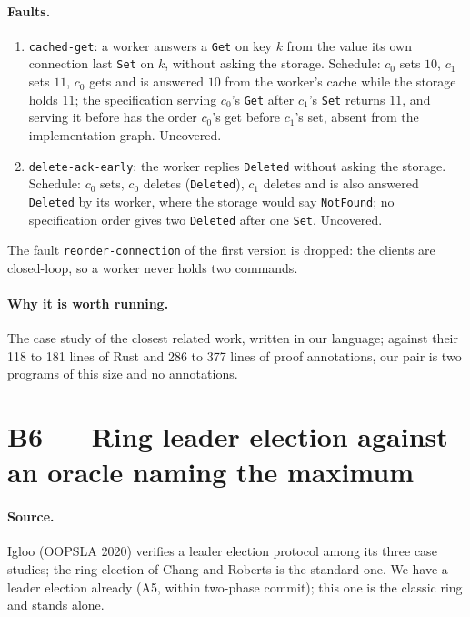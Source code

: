 \documentclass[11pt,a4paper]{article}
\newcommand{\code}[1]{\texttt{#1}}
\begin{document}
\paragraph{Faults.}
\begin{enumerate}
  \item \code{cached-get}: a worker answers a \code{Get} on key $k$ from the value its own
        connection last \code{Set} on $k$, without asking the storage. Schedule: $c_0$ sets
        $10$, $c_1$ sets $11$, $c_0$ gets and is answered $10$ from the worker's cache while the
        storage holds $11$; the specification serving $c_0$'s \code{Get} after $c_1$'s \code{Set}
        returns $11$, and serving it before has the order $c_0$'s get before $c_1$'s set, absent
        from the implementation graph. Uncovered.
  \item \code{delete-ack-early}: the worker replies \code{Deleted} without asking the storage.
        Schedule: $c_0$ sets, $c_0$ deletes (\code{Deleted}), $c_1$ deletes and is also answered
        \code{Deleted} by its worker, where the storage would say \code{NotFound}; no
        specification order gives two \code{Deleted} after one \code{Set}. Uncovered.
\end{enumerate}
The fault \code{reorder-connection} of the first version is dropped: the clients are
closed-loop, so a worker never holds two commands.

\paragraph{Why it is worth running.} The case study of the closest related work, written in
our language; against their 118 to 181 lines of Rust and 286 to 377 lines of proof annotations,
our pair is two programs of this size and no annotations.

\section{B6 --- Ring leader election against an oracle naming the maximum}

\paragraph{Source.} Igloo (OOPSLA 2020) verifies a leader election protocol among its three case
studies; the ring election of Chang and Roberts is the standard one. We have a leader election
already (A5, within two-phase commit); this one is the classic ring and stands alone.
\end{document}
